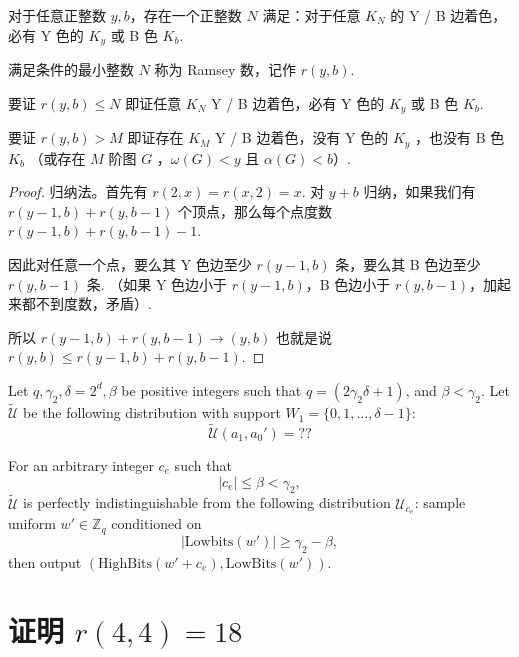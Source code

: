 \begin{theorem}
    对于任意正整数 $y,b$，存在一个正整数 $N$ 满足：对于任意 $K_N$ 的 Y / B 边着色，必有 Y 色的 $K_y$ 或 B 色 $K_b$.

    满足条件的最小整数 $N$ 称为 Ramsey 数，记作 $r(y,b)$.
\end{theorem}

要证 $r(y,b)\leq N$ 即证任意 $K_N$  Y / B 边着色，必有 Y 色的 $K_y$ 或 B 色 $K_b$.

要证 $r(y,b)> M$ 即证存在 $K_M$  Y / B 边着色，没有 Y 色的 $K_y$ ，也没有 B 色 $K_b$ （或存在 $M$ 阶图 $G$ ，$\omega(G)<y$ 且 $\alpha(G)<b$）.

\begin{proof}
    归纳法。首先有 $r(2,x)=r(x,2)=x$. 对 $y+b$ 归纳，如果我们有 $r(y-1,b)+r(y,b-1)$ 个顶点，那么每个点度数 $r(y-1,b)+r(y,b-1)-1$.

    因此对任意一个点，要么其 Y 色边至少 $r(y-1,b)$ 条，要么其 B 色边至少 $r(y,b-1)$ 条. 
    （如果 Y 色边小于 $r(y-1,b)$，B 色边小于 $r(y,b-1)$，加起来都不到度数，矛盾）.

    所以 $r(y-1,b)+r(y,b-1)\to(y,b)$ 也就是说 $r(y,b)\leq r(y-1,b)+r(y,b-1)$.
\end{proof}

\begin{lemma}
Let \(q,\gamma_2,\delta=2^d,\beta\) be positive integers such that \(q=(2\gamma_2\delta+1)\), and \(\beta<\gamma_2\). 
Let \(\widetilde{\mathcal{U}}\)
be the following distribution with support
\(
W_1=\{0,1,\ldots,\delta-1\}:
\)
\begin{equation}
\widetilde{\mathcal{U}}(a_1,a_0')=??
\end{equation}

For an arbitrary integer \(c_e\) such that
\[
|c_e|\leq \beta<\gamma_2,
\]
\(\widetilde{\mathcal{U}}\) is perfectly indistinguishable from the
following distribution \(\mathcal{U}_{c_e}\): sample uniform \(w'\in\mathbb{Z}_q\)
conditioned on
\[
|\mathrm{Lowbits}(w')|\geq \gamma_2-\beta,
\]
then output \(\left(\mathrm{HighBits}(w'+c_e),\mathrm{LowBits}(w')\right)\).
\end{lemma}


\section{证明 $r(4,4)=18$}

